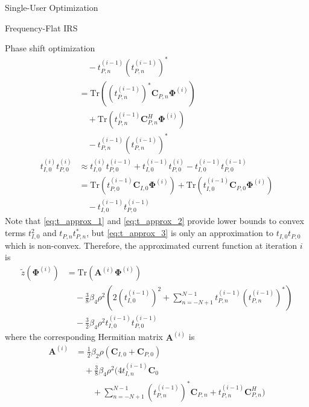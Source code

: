 \documentclass{IEEEtran}
\begin{document}
\begin{section}{Single-User Optimization}
\begin{subsection}{Frequency-Flat IRS}
\begin{subsubsection}{Phase shift optimization}
\begin{align}
				& \quad - t_{P,n}^{(i-1)} (t_{P,n}^{(i-1)})^*\nonumber\\
				& = \mathrm{Tr}\left((t_{P,n}^{(i-1)})^*\boldsymbol{C}_{P,n}\boldsymbol{\Phi}^{(i)}\right)\nonumber\\
				& \quad + \mathrm{Tr}\left(t_{P,n}^{(i-1)}\boldsymbol{C}_{P,n}^H\boldsymbol{\Phi}^{(i)}\right)\nonumber\\
				& \quad- t_{P,n}^{(i-1)} (t_{P,n}^{(i-1)})^*\label{eq:t_approx_2}\\
				t_{I,0}^{(i)} t_{P,0}^{(i)}
				& \approx t_{I,0}^{(i)} t_{P,0}^{(i-1)} + t_{I,0}^{(i-1)} t_{P,0}^{(i)} - t_{I,0}^{(i-1)} t_{P,0}^{(i-1)}\nonumber\\
				& = \mathrm{Tr}(t_{P,0}^{(i-1)}\boldsymbol{C}_{I,0}\boldsymbol{\Phi}^{(i)}) + \mathrm{Tr}(t_{I,0}^{(i-1)}\boldsymbol{C}_{P,0}\boldsymbol{\Phi}^{(i)})\nonumber\\
				& \quad - t_{I,0}^{(i-1)} t_{P,0}^{(i-1)}\label{eq:t_approx_3}
			\end{align}
			Note that \ref{eq:t_approx_1} and \ref{eq:t_approx_2} provide lower bounds to convex terms $t_{I,0}^2$ and $t_{P,n} t_{P,n}^*$, but \ref{eq:t_approx_3} is only an approximation to $t_{I,0} t_{P,0}$ which is non-convex. Therefore, the approximated current function at iteration $i$ is
			\begin{equation}\label{eq:z_irs_approx}
				\begin{split}
					\tilde{z}(\boldsymbol{\Phi}^{(i)})
					& = \mathrm{Tr}(\boldsymbol{A}^{(i)}\boldsymbol{\Phi}^{(i)})\\
					& \quad - \frac{3}{8} \beta_4 \rho^2 \left(2 (t_{I,0}^{(i-1)})^2 + \sum_{n=-N+1}^{N-1} t_{P,n}^{(i-1)} (t_{P,n}^{(i-1)})^* \right)\\
					& \quad - \frac{3}{2} \beta_4 \rho^2 t_{I,0}^{(i-1)} t_{P,0}^{(i-1)}
				\end{split}
			\end{equation}
			where the corresponding Hermitian matrix $\boldsymbol{A}^{(i)}$ is
			\begin{equation}\label{eq:A}
				\begin{split}
					\boldsymbol{A}^{(i)}
					& = \frac{1}{2} \beta_2 \rho (\boldsymbol{C}_{I,0}+\boldsymbol{C}_{P,0})\\
					& \quad+ \frac{3}{8} \beta_4 \rho^2 \Biggl(4 t_{I,n}^{(i-1)} \boldsymbol{C}_0\\
					& \quad \quad + \sum_{n=-N+1}^{N-1} (t_{P,n}^{(i-1)})^*\boldsymbol{C}_{P,n} + t_{P,n}^{(i-1)}\boldsymbol{C}_{P,n}^H \Biggl)\\

\end{split}
\end{equation}
\end{subsubsection}
\end{subsection}
\end{section}
\end{document}
